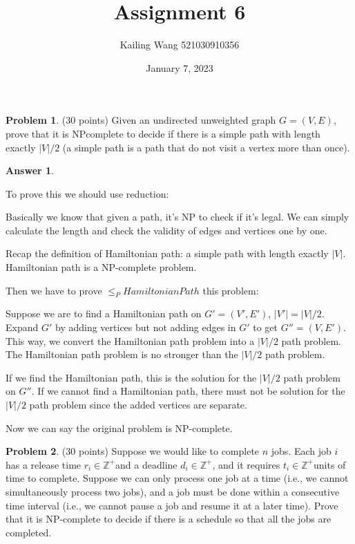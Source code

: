 \documentclass{article}
\theoremstyle{definition}
\newtheorem{prob}{Problem}
\newtheorem{ans}{Answer}
\begin{document}
	\title{Assignment 6}
	\author{Kailing Wang 521030910356}
	\date{January 7, 2023}
\maketitle	
	\begin{prob}
		(30 points) Given an undirected unweighted graph $G=(V, E)$, prove that it is NPcomplete to decide if there is a simple path with length exactly $|V| / 2$ (a simple path is a path that do not visit a vertex more than once).
	\end{prob}
	
	\begin{ans}
		~
		
		To prove this we should use reduction:
		
		Basically we know that given a path, it's NP to check if it's legal. We can simply calculate the length and check the validity of edges and vertices one by one. 
		
		Recap the definition of Hamiltonian path: a simple path with length exactly $|V|$. Hamiltonian path is a NP-complete problem.
		
		Then we have to prove $\leq_P HamiltonianPath$ this problem:
		
		Suppose we are to find a Hamiltonian path on $G'=(V', E')$, $|V'|=|V|/2$. Expand $G'$ by adding vertices but not adding edges in $G'$ to get $G''=(V, E')$. This way, we convert the Hamiltonian path problem into a $|V| / 2$ path problem. The Hamiltonian path problem is no stronger than the $|V| / 2$ path problem.
		
		If we find the Hamiltonian path, this is the solution for the $|V| / 2$ path problem on $G''$. If we cannot find a Hamiltonian path, there must not be solution for the $|V| / 2$ path problem since the added vertices are separate. 
		
		Now we can say the original problem is NP-complete.
	\end{ans}
	
	\begin{prob}
		(30 points) Suppose we would like to complete $n$ jobs. Each job $i$ has a release time $r_{i} \in \mathbb{Z}^{+}$and a deadline $d_{i} \in \mathbb{Z}^{+}$, and it requires $t_{i} \in \mathbb{Z}^{+}$units of time to complete. Suppose we can only process one job at a time (i.e., we cannot simultaneously process two jobs), and a job must be done within a consecutive time interval (i.e., we cannot pause a job and resume it at a later time). Prove that it is NP-complete to decide if there is a schedule so that all the jobs are completed.
	\end{prob}
\end{document}
